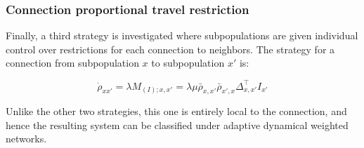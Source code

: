 \subsubsection{Connection proportional travel restriction}

Finally, a third strategy is investigated where subpopulations are given individual control over restrictions for each connection to neighbors. The strategy for a connection from subpopulation $x$ to subpopulation $x'$ is:

\begin{equation}
\dot{\rho}_{xx'} = \lambda M_{(I);x,x'} = \lambda \mu \bar{\rho}_{x,x'} \bar{\rho}_{x',x} \Delta^{\top}_{x,x'} I_{x'}
\end{equation}

Unlike the other two strategies, this one is entirely local to the connection, and hence the resulting system can be classified under adaptive dynamical weighted networks\cite{berner2023adaptive}.\\

